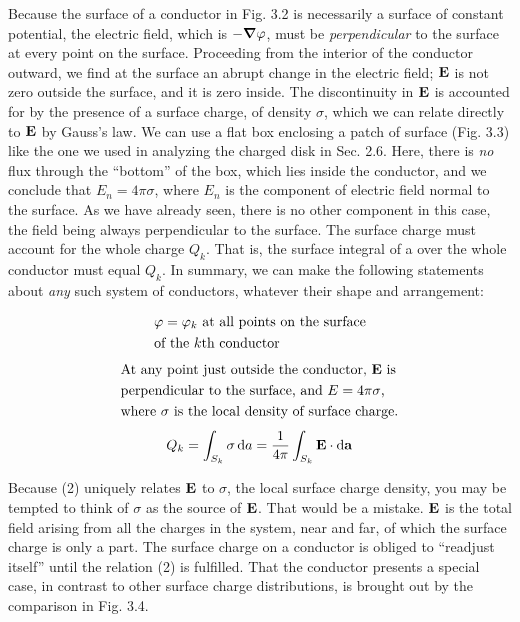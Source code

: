 Because the surface of a conductor in Fig. 3.2 is necessarily a surface
of constant potential, the electric field, which is $-\boldsymbol{\nabla}\varphi$, must
be \emph{perpendicular} to the surface at every point on the surface. Proceeding
from the interior of the conductor outward, we find at the surface
an abrupt change in the electric field; $\mathbf{E}$ is not zero outside the
surface, and it is zero inside. The discontinuity in $\mathbf{E}$ is accounted for
by the presence of a surface charge, of density $\sigma$, which we can relate
directly to $\mathbf{E}$ by Gauss's law. We can use a flat box enclosing a patch
of surface (Fig. 3.3) like the one we used in analyzing the charged
disk in Sec. 2.6. Here, there is \emph{no} flux through the ``bottom'' of the
box, which lies inside the conductor, and we conclude that $E_n=4\pi\sigma$,
where $E_n$ is the component of electric field normal to the surface. As
we have already seen, there is no other component in this case, the
field being always perpendicular to the surface. The surface charge
must account for the whole charge $Q_k$. That is, the surface integral
of a over the whole conductor must equal $Q_k$. In summary, we can
make the following statements about \emph{any} such system of conductors,
whatever their shape and arrangement:
%
\begin{framed}
\begin{align}
\begin{split}
&\text{$\varphi = \varphi_k$ at all points on the surface}\\
&\text{of the $k$th conductor} 
\end{split}
\end{align}
%
\begin{align}
\begin{split}
&\text{At any point just outside the conductor, $\mathbf{E}$ is}\\
&\text{perpendicular to the surface, and $E=4\pi\sigma$,}\\
&\text{where $\sigma$ is the local density of surface charge.} 
\end{split}
\end{align}
%
\begin{equation}
Q_k = \int_{S_k}\sigma\operatorname{d\!} a = \frac{1}{4\pi} \int_{S_k}\mathbf{E}\cdot\operatorname{d\!}\mathbf{a}
\end{equation}
\end{framed}
Because (2) uniquely relates $\mathbf{E}$ to $\sigma$, the local surface charge density,
you may be tempted to think of $\sigma$ as the source of $\mathbf{E}$. That would be
a mistake. $\mathbf{E}$ is the total field arising from all the charges in the
system, near and far, of which the surface charge is only a part. The
surface charge on a conductor is obliged to ``readjust itself'' until the
relation (2) is fulfilled. That the conductor presents a special case,
in contrast to other surface charge distributions, is brought out by
the comparison in Fig. 3.4.

